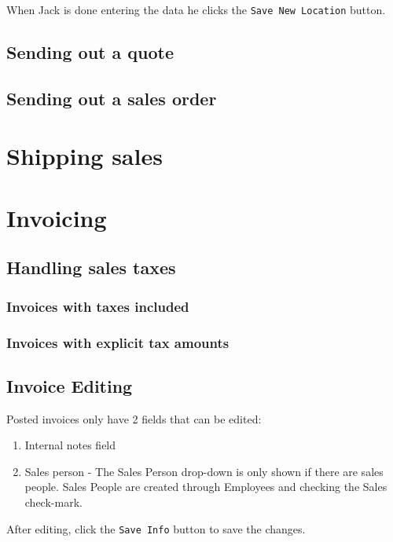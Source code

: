 When Jack is done entering the data he clicks the \texttt{Save New Location} button.

\section{Sending out a quote} 
\label{sec-ramping-sending-a-quote}

\section{Sending out a sales order}
\label{sec-ramping-sending-a-sales-order}



\chapter{Shipping sales}
\label{cha-shipping-sales}



\chapter{Invoicing}
\label{cha-starting-invoicing}

\section{Handling sales taxes}
\label{sec-invoicing-sales-tax}

\subsection{Invoices with taxes included}
\label{subsec-sales-tax-included}

\subsection{Invoices with explicit tax amounts}
\label{subsec-sales-tax-explicit-amount}

\section{Invoice Editing}
\label{sec-invoicing-editing}

Posted invoices only have 2 fields that can be edited:
\begin{enumerate}
\item Internal notes field
\item Sales person - The Sales Person drop-down is only shown if there are sales people. Sales People are created through Employees and checking the Sales check-mark.
\end{enumerate}
After editing, click the  \texttt{Save Info} button to save the changes.

